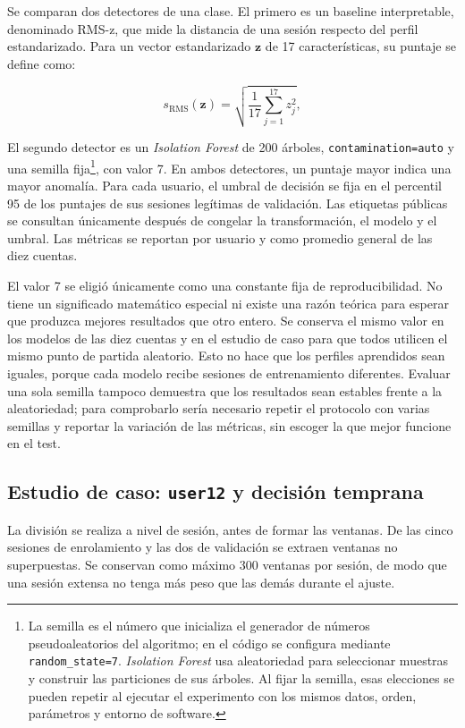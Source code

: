 \documentclass[11pt,letterpaper]{article}
\begin{document}
Se comparan dos detectores de una clase. El primero es un baseline interpretable, denominado RMS-z, que mide la
distancia de una sesión respecto del perfil estandarizado. Para un vector estandarizado \(\mathbf{z}\) de 17
características, su puntaje se define como:

\begin{equation}
  s_{\mathrm{RMS}}(\mathbf{z})=
  \sqrt{\frac{1}{17}\sum_{j=1}^{17}z_j^2},
\end{equation}

El segundo detector es un \emph{Isolation Forest} de 200 árboles, \texttt{contamination=auto} y una semilla fija\footnote{La semilla es el número
que inicializa el generador de números pseudoaleatorios del algoritmo; en el código se configura mediante
\texttt{random\_state=7}. \emph{Isolation Forest} usa aleatoriedad para seleccionar muestras y construir las
particiones de sus árboles. Al fijar la semilla, esas elecciones se pueden repetir al ejecutar el experimento con los
mismos datos, orden, parámetros y entorno de software.}, con valor 7. En ambos detectores, un puntaje mayor indica una mayor
anomalía. Para cada usuario, el umbral de decisión se fija en el percentil 95 de los puntajes de sus sesiones legítimas
de validación. Las etiquetas públicas se consultan únicamente después de congelar la transformación, el modelo y el
umbral. Las métricas se reportan por usuario y como promedio general de las diez cuentas.

El valor 7 se eligió únicamente como una constante fija de reproducibilidad. No tiene un significado matemático
especial ni existe una razón teórica para esperar que produzca mejores resultados que otro entero. Se conserva el mismo
valor en los modelos de las diez cuentas y en el estudio de caso para que todos utilicen el mismo punto de partida
aleatorio. Esto no hace que los perfiles aprendidos sean iguales, porque cada modelo recibe sesiones de entrenamiento
diferentes. Evaluar una sola semilla tampoco demuestra que los resultados sean estables frente a la aleatoriedad; para
comprobarlo sería necesario repetir el protocolo con varias semillas y reportar la variación de las métricas, sin
escoger la que mejor funcione en el test.

\subsection{Estudio de caso: \texttt{user12} y decisión temprana}

La división se realiza a nivel de sesión, antes de formar las ventanas. De las cinco sesiones de enrolamiento y las dos
de validación se extraen ventanas no superpuestas. Se conservan como máximo 300 ventanas por sesión, de modo que una
sesión extensa no tenga más peso que las demás durante el ajuste.
\end{document}
